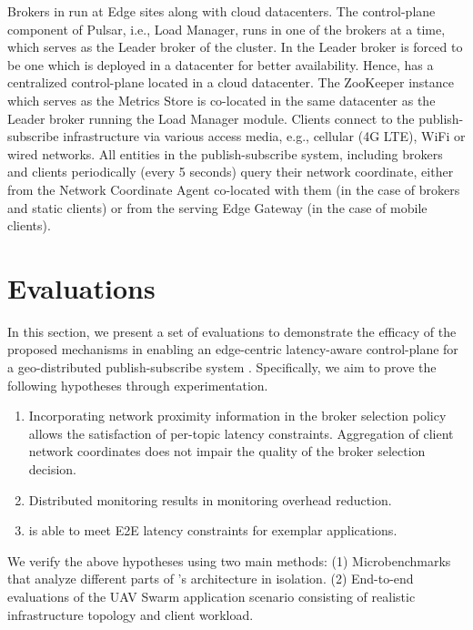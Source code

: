 \par Brokers in \epulsar{} run at Edge sites along with cloud datacenters. The control-plane component of Pulsar, i.e., Load Manager, runs in one of the brokers at a time, which serves as the Leader broker of the cluster. In \epulsar{} the Leader broker is forced to be one which is deployed in a datacenter for better availability. Hence, \epulsar{} has a centralized control-plane located in a cloud datacenter. The ZooKeeper instance which serves as the Metrics Store is co-located in the same datacenter as the Leader broker running the Load Manager module. Clients connect to the publish-subscribe infrastructure via various access media, e.g., cellular (4G LTE), WiFi or wired networks. All entities in the publish-subscribe system, including brokers and clients periodically (every 5 seconds) query their network coordinate, either from the Network Coordinate Agent co-located with them (in the case of brokers and static clients) or from the serving Edge Gateway (in the case of mobile clients).

\section{Evaluations}
\label{sec:epulsar_evals}
In this section, we present a set of evaluations to demonstrate the efficacy of the proposed mechanisms in enabling an edge-centric latency-aware control-plane for a geo-distributed publish-subscribe system \epulsar{}. Specifically, we aim to prove the following hypotheses through experimentation.
\begin{enumerate}
\item Incorporating network proximity information in the broker selection policy allows the satisfaction of per-topic latency constraints. Aggregation of client network coordinates does not impair the quality of the broker selection decision.
\item Distributed monitoring results in monitoring overhead reduction.
\item \epulsar{} is able to meet E2E latency %
constraints for exemplar applications.
\end{enumerate}
We verify the above hypotheses using two main methods: (1) Microbenchmarks that analyze different parts of \epulsar's architecture in isolation. (2) End-to-end evaluations of the UAV Swarm application scenario consisting of realistic infrastructure topology and client workload.

